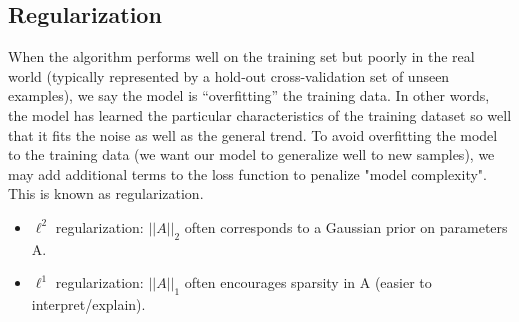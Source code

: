 \documentclass[twoside]{article}
\begin{document}
\subsection{Regularization} \label{sec:regularization}
When the algorithm performs well on the training set but poorly in the real world (typically represented by a hold-out cross-validation set of unseen examples), we say the model is ``overfitting'' the training data. In other words, the model has learned the particular characteristics of the training dataset so well that it fits the noise as well as the general trend. To avoid overfitting the model to the training data (we want our model to generalize well to new samples), we may add additional terms to the loss function to penalize "model complexity". This is known as regularization.

\begin{itemize}
\item $\ell^2$ regularization: $||A||_2$ often corresponds to a Gaussian prior on parameters A. 
\item $\ell^1$ regularization: $||A||_1$ often encourages sparsity in A (easier to interpret/explain).
\end{itemize}
\end{document}
